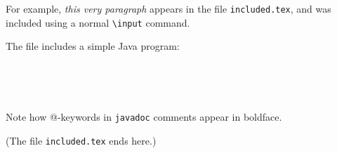 For example, \emph{this very paragraph} appears in the file \texttt{included.tex}, and
	was included using a normal \texttt{\textbackslash{}input} command.

The file includes a simple Java program:

~


~

Note how @-keywords in \texttt{javadoc} comments appear in boldface.

(The file \texttt{included.tex} ends here.)

